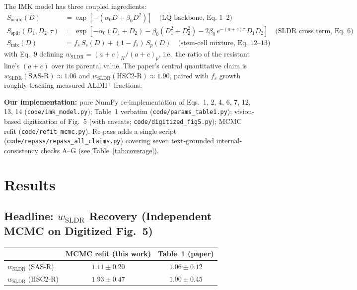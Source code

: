\documentclass[11pt]{article}
\begin{document}
The IMK model has three coupled ingredients:
\begin{align}
S_{\mathrm{acute}}(D) &= \exp\!\left[-(\alpha_0 D + \beta_0 D^2)\right] \quad \text{(LQ backbone, Eq.~1--2)} \\
S_{\mathrm{split}}(D_1,D_2,\tau) &= \exp\!\left[-\alpha_0(D_1+D_2) - \beta_0(D_1^2+D_2^2)
     - 2\beta_0\, e^{-(a+c)\tau}\, D_1 D_2\right] \quad \text{(SLDR cross term, Eq.~6)} \\
S_{\mathrm{mix}}(D) &= f_s\, S_s(D) + (1-f_s)\, S_p(D) \quad \text{(stem-cell mixture, Eq.~12--13)}
\end{align}
with Eq.~9 defining $w_{\mathrm{SLDR}} = (a+c)_H / (a+c)_p$, i.e.\ the ratio of the resistant line's
$(a+c)$ over its parental value. The paper's central quantitative claim is
$w_{\mathrm{SLDR}}(\text{SAS-R}) \approx 1.06$ and $w_{\mathrm{SLDR}}(\text{HSC2-R}) \approx 1.90$,
paired with $f_s$ growth roughly tracking measured ALDH$^{+}$ fractions.

\textbf{Our implementation:} pure NumPy re-implementation of Eqs.~1, 2, 4, 6, 7, 12, 13, 14
(\texttt{code/imk\_model.py}); Table~1 verbatim (\texttt{code/params\_table1.py}); vision-based
digitization of Fig.~5 (with caveats; \texttt{code/digitized\_fig5.py}); MCMC refit
(\texttt{code/refit\_mcmc.py}). Re-pass adds a single script
(\texttt{code/repass/repass\_all\_claims.py}) covering seven text-grounded internal-consistency
checks A--G (see Table~\ref{tab:coverage}).

\section{Results}

\subsection{Headline: $w_{\mathrm{SLDR}}$ Recovery (Independent MCMC on Digitized Fig.~5)}

\begin{center}
\begin{tabular}{lcc}
\toprule
 & MCMC refit (this work) & Table~1 (paper) \\
\midrule
$w_{\mathrm{SLDR}}$ (SAS-R)  & $1.11 \pm 0.20$ & $1.06 \pm 0.12$ \\
$w_{\mathrm{SLDR}}$ (HSC2-R) & $1.93 \pm 0.47$ & $1.90 \pm 0.45$ \\
\bottomrule
\end{tabular}
\end{center}
\end{document}
